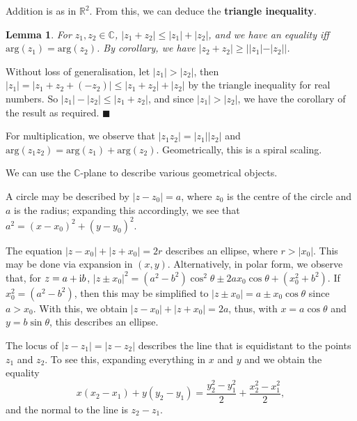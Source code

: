 \documentclass[letter-paper]{tufte-book}
\newtheorem{lemma}[theorem]{\color{pastel-blue}Lemma}
\newenvironment{proof}[1][Proof]{\begin{trivlist}
\item[\hskip \labelsep {\bfseries #1}]}{\end{trivlist}}
\newenvironment{example}[1][Example]{\begin{trivlist}
\item[\hskip \labelsep {\bfseries #1}]}{\end{trivlist}}
\newcommand{\zi}{{\rm i}}
\newcommand\Def[1]{\textbf{#1}}
\newcommand{\qed}{\hfill$\blacksquare$}
\begin{document}
Addition is as in $\mathbb{R}^2$. From this, we can deduce the \Def{triangle
inequality}.
\begin{lemma}
	For $z_1,z_2\in\mathbb{C}$, $|z_1 +z_2|\leq|z_1|+|z_2|$, and we have an
	equality iff $\mbox{arg}(z_1)=\mbox{arg}(z_2)$. By corollary, we have $|z_2
	+z_2|\geq||z_1|-|z_2||$.
\end{lemma}
\begin{proof}
	Without loss of generalisation, let $|z_1|>|z_2|$, then $|z_1|=|z_1 + z_2 +
	(-z_2)|\leq|z_1+z_2|+|z_2|$ by the triangle inequality for real numbers. So
	$|z_1|-|z_2|\leq|z_1+z_2|$, and since $|z_1|>|z_2|$, we have the corollary
	of the result as required. \qed
\end{proof}

For multiplication, we observe that $|z_1 z_2|=|z_1||z_2|$ and $\mbox{arg}(z_1
z_2)=\mbox{arg}(z_1)+\mbox{arg}(z_2)$. Geometrically, this is a spiral scaling.

We can use the $\mathbb{C}$-plane to describe various geometrical objects.
\begin{example}
	A circle may be described by $|z-z_0|=a$, where $z_0$ is the centre of the
	circle and $a$ is the radius; expanding this accordingly, we see that $a^2 =
	(x-x_0)^2 + (y-y_0)^2$.
\end{example}
\begin{example}
	The equation $|z-x_0|+|z+x_0|=2r$ describes an ellipse, where $r>|x_0|$.
	This may be done via expansion in $(x,y)$. Alternatively, in polar form, we
	observe that, for $z=a+\zi b$, $|z\pm x_0|^2 = (a^2-b^2)\cos^2\theta\pm
	2ax_0\cos\theta + (x_0^2+b^2)$. If $x_0^2=(a^2-b^2)$, then this may be
	simplified to $|z\pm x_0|=a\pm x_0\cos\theta$ since $a>x_0$. With this, we
	obtain $|z-x_0|+|z+x_0|=2a$, thus, with $x=a\cos\theta$ and $y=b\sin\theta$,
	this describes an ellipse.
\end{example}
\begin{example}
	The locus of $|z-z_1|=|z-z_2|$ describes the line that is equidistant to the
	points $z_1$ and $z_2$. To see this, expanding everything in $x$ and $y$ and
	we obtain the equality
	\begin{equation*}
		x(x_2-x_1) + y(y_2-y_1) 
		= \frac{y_2^2-y_1^2}{2} + \frac{x_2^2 - x_1^2}{2},
	\end{equation*}
	and the normal to the line is $z_2-z_1$.
\end{example}

\end{document}

